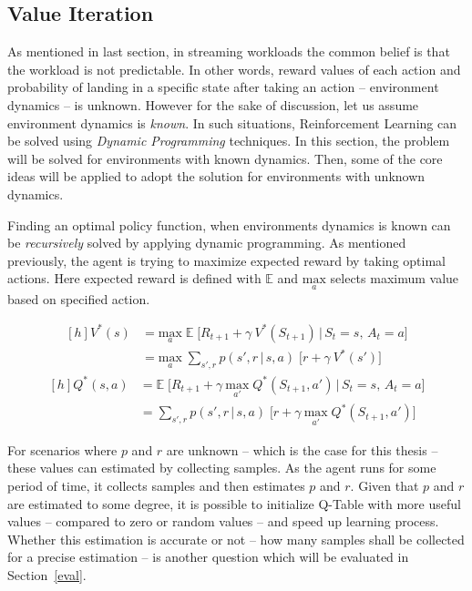 \subsection{Value Iteration}
\label{des:val}

As mentioned in last section, in streaming workloads the common belief is that the workload is not predictable. In other words, reward values of each action and probability of landing in a specific state after taking an action -- environment dynamics -- is unknown. However for the sake of discussion, let us assume environment dynamics is \emph{known}. In such situations, Reinforcement Learning can be solved using \emph{Dynamic Programming} techniques. In this section, the problem will be solved for environments with known dynamics. Then, some of the core ideas will be applied to adopt the solution for environments with unknown dynamics.

Finding an optimal policy function, when environments dynamics is known can be \emph{recursively} solved by applying dynamic programming. As mentioned previously, the agent is trying to maximize expected reward by taking optimal actions. Here expected reward is defined with $\mathbb E$ and $\underset{a}{\text{max}}$ selects maximum value based on specified action.

\begin{equation}
\begin{aligned}[h]
V^*(s) &= \underset{a}{\text{max}} \; \mathbb E\;\big[R_{t+1} + \gamma\:V^*(S_{t+1})\,|\,S_t=s,\,A_t=a\big] \\
&= \underset{a}{\text{max}} \; \sum_{s',r} p(s',r\,|\,s,a)\;\Big[r + \gamma\:V^*(s')\Big]
\end{aligned}
\label{des:eq:dpv}
\end{equation}
\begin{equation}
\begin{aligned}[h]
Q^*(s,a) &= \mathbb E\;\big[R_{t+1} + \gamma\:\underset{a'}{\text{max}}\;Q^*(S_{t+1},a')\,|\,S_t=s,\,A_t=a\big] \\
&= \sum_{s',r} p(s',r\,|\,s,a)\;\Big[r + \gamma\:\underset{a'}{\text{max}}\;Q^*(S_{t+1},a')\Big]
\end{aligned}
\label{des:eq:dpq}
\end{equation}

For scenarios where $p$ and $r$ are unknown -- which is the case for this thesis -- these values can estimated by collecting samples. As the agent runs for some period of time, it collects samples and then estimates $p$ and $r$. Given that $p$ and $r$ are estimated to some degree, it is possible to initialize Q-Table with more useful values -- compared to zero or random values -- and speed up learning process. Whether this estimation is accurate or not -- how many samples shall be collected for a precise estimation -- is another question which will be evaluated in Section~\ref{eval}.

